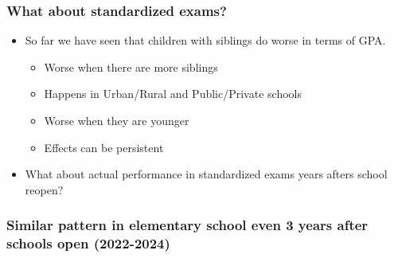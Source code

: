 \documentclass{beamer}
\begin{document}
\begin{frame}
    \label{frame:recap1}
    \frametitle{What about standardized exams?}
    \begin{itemize}
       \item So far we have seen that children with siblings do worse in terms of GPA.
        \begin{itemize}
            \item Worse when there are more siblings
            \item Happens in Urban/Rural and Public/Private schools
            \item Worse when they are younger
            \item Effects can be persistent
        \end{itemize}
        \item What about actual performance in standardized exams years afters school reopen?
    \end{itemize}
\end{frame}

\begin{frame}
    \label{frame:twfe_gpa_2_4_8}
    \frametitle{Similar pattern in elementary school even 3 years after schools open (2022-2024)}
        {
    }
\end{frame}
\end{document}
